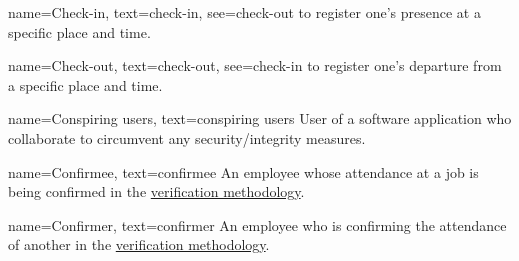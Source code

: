 {
  name={Check-in},
  text={check-in},
  see={check-out}
}
{
  to register one's presence at a specific place and time.
}

{
  name={Check-out},
  text={check-out},
  see={check-in}
}
{
  to register one's departure from a specific place and
  time.
}

{
  name={Conspiring users},
  text={conspiring users}
}
{
  User of a software application who collaborate to
  circumvent any security/integrity measures.
}

{
  name={Confirmee},
  text={confirmee}
}
{
  An employee whose attendance at a job is being confirmed
  in the \hyperref[s:concept]{verification methodology}.
}

{
  name={Confirmer},
  text={confirmer}
}
{
  An employee who is confirming the attendance of another
  in the \hyperref[s:concept]{verification methodology}.
}